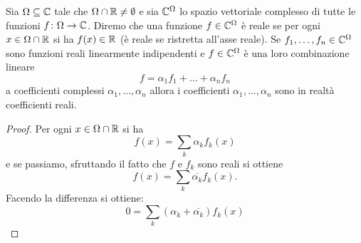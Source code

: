 \begin{lemma}
Sia $\Omega\subseteq \mathbb C$ tale che $\Omega\cap\mathbb R\neq \emptyset$
e sia $\mathbb C^\Omega$ lo spazio
vettoriale complesso di tutte le funzioni $f\colon \Omega \to \mathbb C$.
Diremo che una funzione $f\in \mathbb C^\Omega$ è
reale se per ogni $x\in \Omega\cap \mathbb R$ si ha $f(x)\in \mathbb R$
(è reale se ristretta all'asse reale).
Se $f_1, \dots, f_n\in \mathbb C^\Omega$ sono funzioni reali
linearmente indipendenti e $f\in \mathbb C^\Omega$
è una loro combinazione lineare
\[
  f = \alpha_1 f_1 + \dots + \alpha_n f_n
\]
a coefficienti complessi
$\alpha_1, \dots, \alpha_n$
allora i coefficienti
$\alpha_1, \dots, \alpha_n$ sono in realtà
coefficienti reali.
\end{lemma}
%
\begin{proof}
Per ogni $x\in \Omega\cap \mathbb R$ si ha
\[
  f(x) = \sum_k \alpha_k f_k(x)
\]
e se passiamo, sfruttando il fatto
che $f$ e $f_k$ sono reali si ottiene
\[
  f(x) = \sum_k \overline{\alpha_k} f_k(x).
\]
Facendo la differenza si ottiene:
\[
  0  = \sum_k (\alpha_k + \overline{\alpha_k}) f_k(x)
\]
\end{proof}

